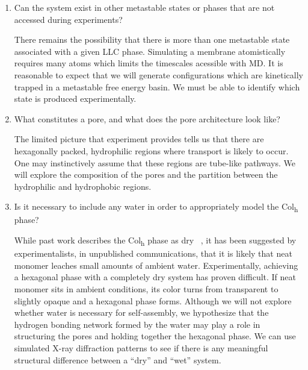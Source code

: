 \documentclass{article}
\begin{document}
\begin{enumerate}
  \item Can the system exist in other metastable states or phases that are not
  accessed during experiments? \label{point:metastable}
  
  There remains the possibility that there is more than one metastable state
  associated with a given LLC phase. Simulating a membrane atomistically
  requires many atoms which limits the timescales acessible with MD. It is
  reasonable to expect that we will generate configurations which are kinetically
  trapped in a metastable free energy basin. We must be able to identify which
  state is produced experimentally.

  \item What constitutes a pore, and what does the pore architecture look like? \label{point:poredefinition}

  The limited picture that experiment provides tells us that there are
  hexagonally packed, hydrophilic regions where transport is likely to occur.
  One may instinctively assume that these regions are tube-like pathways. We will
  explore the composition of the pores and the partition between the
  hydrophilic and hydrophobic regions. 

  \item Is it necessary to include any water in order to appropriately model
  the Col\textsubscript{h} phase? \label{point:water}

  While past work describes the Col\textsubscript{h} phase as dry
  ~\cite{feng_scalable_2014}, it has been suggested by experimentalists, in
  unpublished communications, that it is likely that neat monomer leaches small
  amounts of ambient water. Experimentally, achieving a hexagonal phase with a
  completely dry system has proven difficult. If neat monomer sits in ambient
  conditions, its color turns from transparent to slightly opaque and a hexagonal
  phase forms. Although we will not explore whether water is necessary for
  self-assembly, we hypothesize that the hydrogen bonding network formed by the
  water may play a role in structuring the pores and holding together the
  hexagonal phase. We can use simulated X-ray diffraction patterns to see if
  there is any meaningful structural difference between a ``dry'' and ``wet''
  system.

  \end{enumerate}
  
\end{document}
